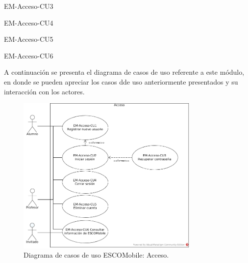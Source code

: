 \begin{requisitos}{EM-Acceso-CU3}
\end{requisitos}

\begin{requisitos}{EM-Acceso-CU4}
\end{requisitos}

\begin{requisitos}{EM-Acceso-CU5}
\end{requisitos}

\begin{requisitos}{EM-Acceso-CU6}
\end{requisitos}

\noindent
A continuación se presenta el diagrama de casos de uso referente a este módulo, en donde se pueden apreciar
los casos dde uso anteriormente presentados y su interacción con los actores.

\pagebreak
\begin{figure}[htbp!]
	\centering
	\includegraphics[width=0.8\textwidth]{images/casos/acceso}
	\caption{Diagrama de casos de uso ESCOMobile: Acceso.}
\end{figure}





